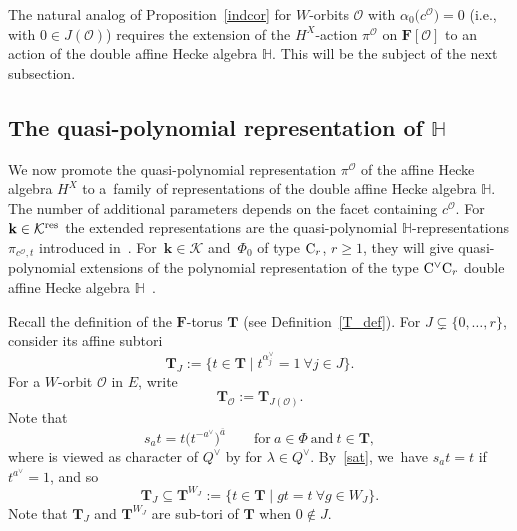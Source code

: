 \documentclass[11pt]{article}
\numberwithin{equation}{section}
\numberwithin{equation}{section}
\begin{document}
The natural analog of Proposition~\ref{indcor} for $W$-orbits $\mathcal{O}$ with $\alpha_0\bigl(c^\mathcal{O}\bigr)=0$ (i.e., with $0\in J(\mathcal{O})$) requires the extension of the $H^X$-action $\pi^\mathcal{O}$ on $\mathbf{F}[\mathcal{O}]$ to an action of the double affine Hecke algebra $\mathbb{H}$. This will be the subject of the next subsection.

\subsection[The quasi-polynomial representation of H]{The quasi-polynomial representation of $\boldsymbol{\mathbb{H}}$}\label{wtsection}
We now promote the quasi-polynomial representation $\pi^\mathcal{O}$ of the affine Hecke algebra $H^X$ to a~family of representations of the double affine Hecke algebra $\mathbb{H}$.
The number of additional parameters
depends on the facet  containing $c^\mathcal{O}$.
For $\mathbf{k}\in\mathcal{K}^{{\rm res}}$ the extended representations are the quasi-polynomial $\mathbb{H}$-representations $\pi_{c^\mathcal{O},t}$ introduced in~\cite[Theorem~1.1]{SSV2}. For~${\mathbf{k}\in\mathcal{K}}$ and~$\Phi_0$ of type ${\rm C}_r$, $r\geq 1$, they will give quasi-polynomial extensions of the polynomial representation of the
type ${\rm C}^\vee{\rm C}_r$ double affine Hecke algebra $\mathbb{H}$~\cite{No,Sa}.

Recall the definition of the $\mathbf{F}$-torus $\mathbf{T}$ (see Definition~\ref{T_def}). For $J\subsetneq\{0,\dots,r\}$, consider its affine subtori
\begin{equation*}
\mathbf{T}_J:=\bigl\{t\in\mathbf{T}\mid t^{\alpha_j^\vee}=1\ \forall j\in J\bigr\}.
\end{equation*}
For a $W$-orbit $\mathcal{O}$ in $E$, write
\[\mathbf{T}_\mathcal{O}:=\mathbf{T}_{J(\mathcal{O})}.
\]
Note that
\begin{equation}\label{sat}
s_at=t\bigl(t^{-a^\vee}\bigr)^{\overline{a}}\qquad \text{for}\ a\in\Phi\ \text{and}\ t\in\mathbf{T},
\end{equation}
where  is viewed as character of $Q^\vee$ by  for
$\lambda\in Q^\vee$. By~\eqref{sat}, we~have
$s_at=t$ if $t^{a^\vee}=1$, and so
\begin{equation}\label{containedinv}
\mathbf{T}_J\subseteq\mathbf{T}^{W_J}:=\{t\in\mathbf{T} \mid gt=t\ \forall g\in W_J\}.
\end{equation}
Note that $\mathbf{T}_J$ and $\mathbf{T}^{W_J}$ are sub-tori of $\mathbf{T}$ when $0\not\in J$.
\end{document}
